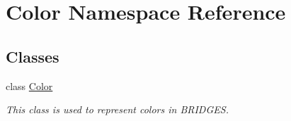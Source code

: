 \hypertarget{namespace_color}{}\section{Color Namespace Reference}
\label{namespace_color}
\subsection*{Classes}
\begin{DoxyCompactItemize}
\item 
class \hyperlink{class_color_1_1_color}{Color}
\begin{DoxyCompactList}\small\item\em This class is used to represent colors in B\+R\+I\+D\+G\+E\+S. \end{DoxyCompactList}\end{DoxyCompactItemize}
